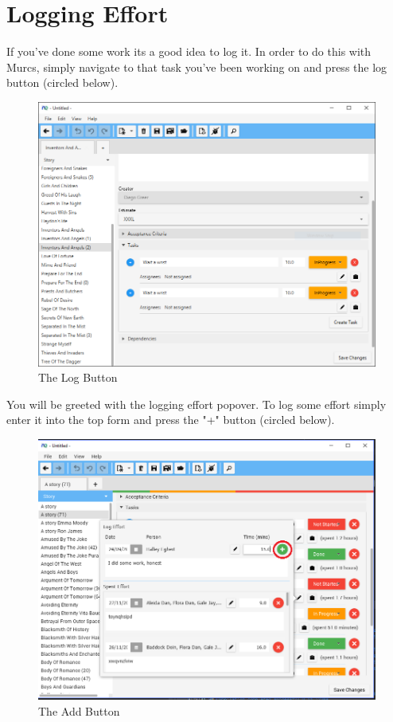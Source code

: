 \section{Logging Effort}

If you've done some work its a good idea to log it. In order to do this with Murcs, simply navigate to that task you've been working on and press the log button (circled below).

\begin{figure}[H]
\centering
\includegraphics[width=\textwidth]{images/screenshots/logging1.PNG}
\caption{The Log Button}
\label{fig:new_project}
\end{figure}

You will be greeted with the logging effort popover. To log some effort simply enter it into the top form and press the "+" button (circled below). 

\begin{figure}[H]
\centering
\includegraphics[width=\textwidth]{images/screenshots/logging3.png}
\caption{The Add Button}
\label{fig:new_project}
\end{figure}

